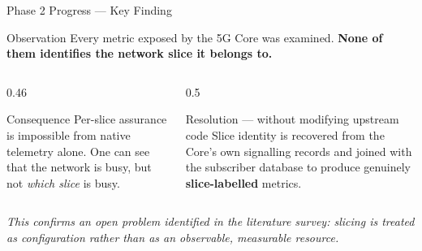 \documentclass[aspectratio=169,11pt]{beamer}
\begin{document}
\begin{frame}{Phase 2 Progress --- Key Finding}
  \begin{block}{Observation}
    \small
    Every metric exposed by the 5G Core was examined. \textbf{None of them
    identifies the network slice it belongs to.}
  \end{block}
  \begin{columns}[T,onlytextwidth]
    \begin{column}{0.46\textwidth}
      \begin{block}{Consequence}
        \small
        Per-slice assurance is impossible from native telemetry alone. One can
        see that the network is busy, but not \emph{which slice} is busy.
      \end{block}
    \end{column}
    \begin{column}{0.5\textwidth}
      \begin{block}{Resolution --- without modifying upstream code}
        \small
        Slice identity is recovered from the Core's own signalling records and
        joined with the subscriber database to produce genuinely
        \textbf{slice-labelled} metrics.
      \end{block}
    \end{column}
  \end{columns}
  \vfill
  \begin{center}
    \small\itshape
    This confirms an open problem identified in the literature survey: slicing is
    treated as configuration rather than as an observable, measurable resource.
  \end{center}
\end{frame}
\end{document}
